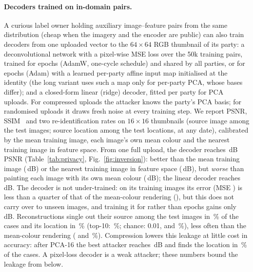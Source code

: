\paragraph{Decoders trained on in-domain pairs.}
A curious label owner holding auxiliary image--feature pairs from the same distribution (cheap when the imagery and the encoder are public) can also train decoders from one uploaded vector to the $64\times64$ RGB thumbnail of its party: a deconvolutional network with a pixel-wise MSE loss over the 50k training pairs, trained for \invEpochs{} epochs (AdamW, one-cycle schedule) and shared by all parties, or for \invShortEpochs{} epochs (Adam) with a learned per-party affine input map initialised at the identity (the long variant uses such a map only for per-party PCA, whose bases differ); and a closed-form linear (ridge) decoder, fitted per party for PCA uploads. For compressed uploads the attacker knows the party's PCA basis; for randomised uploads it draws fresh noise at every training step. We report PSNR, SSIM~\cite{wang2004ssim} and two re-identification rates on $16\times16$ thumbnails (source image among the test images; source location among the \invNLoc{} test locations, at any date), calibrated by the mean training image, each image's own mean colour and the nearest training image in feature space. From one full upload, the decoder reaches \invFull\,dB PSNR (Table~\ref{tab:privacy}, Fig.~\ref{fig:inversion}): better than the mean training image (\invMean\,dB) or the nearest training image in feature space (\invNN\,dB), but \emph{worse} than painting each image with its own mean colour (\invColour\,dB); the linear decoder reaches \invLinFull\,dB. The decoder is not under-trained: on its training images its error (MSE \invFullTrainMse) is less than a quarter of that of the mean-colour rendering (\invColourTrainMse), but this does not carry over to unseen images, and training it for \invEpochs{} rather than \invShortEpochs{} epochs gains only \invGainLong\,dB. Reconstructions single out their source among the \lkN{} test images in \invFullReid\,\% of the cases and its location in \invFullReidLoc\,\% (top-10: \invFullReidLocTen\,\%; chance: 0.01, \invChanceLoc{} and \invChanceLocTen\,\%), less often than the mean-colour rendering (\invColourReidLoc{} and \invColourReidLocTen\,\%). Compression lowers this leakage at little cost in accuracy: after PCA-16 the best attacker reaches \invBestPCAst\,dB and finds the location in \invBestPCAstReidLoc\,\% of the cases. A pixel-loss decoder is a weak attacker; these numbers bound the leakage from below.

